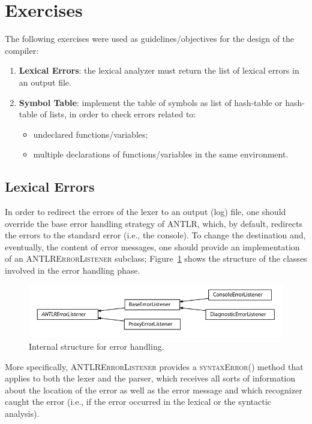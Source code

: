 \documentclass[11pt]{article} %
\begin{document}
\section{Exercises}
\label{sec:exercices}
The following exercises were used as guidelines/objectives for the design of the compiler:

\begin{enumerate}
\item \textbf{Lexical Errors}: the lexical analyzer must return the list of lexical errors in an output file. 
\item \textbf{Symbol Table}: implement the table of symbols as list of hash-table or hash-table of lists, in order to check errors related to:
\begin{itemize}
\item undeclared functions/variables;
\item multiple declarations of functions/variables in the same environment.
\end{itemize}
\end{enumerate}

\subsection{Lexical Errors}
In order to redirect the errors of the lexer to an output (log) file, one should override the base error handling strategy of ANTLR, which, by default, redirects the errors to the standard error (i.e., the console). To change the destination and, eventually, the content of error messages, one should provide an implementation of an \textsc{ANTLRErrorListener} subclass; Figure~\ref{fig:err} shows the structure of the classes involved in the error handling phase.
\begin{figure}
\includegraphics[width=\textwidth]{errorListener.png}
\caption{Internal structure for error handling.}
\label{fig:err}
\end{figure}   
More specifically, \textsc{ANTLRErrorListener} provides a \textsc{syntaxError()} method that applies to both the lexer and the parser, which receives all sorts of information about the location of the error as well as the error message and which recognizer caught the error (i.e., if the error occurred in the lexical or the syntactic analysis).   
\end{document}
